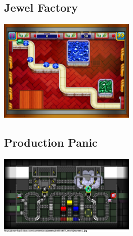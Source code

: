 \documentclass[a4paper]{scrartcl}
\begin{document}
    \begin{multicols}{2}
        \subsection{Jewel Factory}
            \includegraphics[width=0.49\textwidth]{similar_games/JewelFactory}

        \subsection{Production Panic}
            \includegraphics[width=0.49\textwidth]{similar_games/ProductionPanic}
    \end{multicols}
\end{document}

